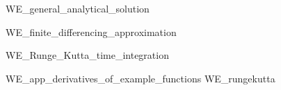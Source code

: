 \documentclass[a4paper,headsepline,12pt,oneside]{scrartcl}
\begin{document}


\newpage
\setcounter{page}{0}
\tableofcontents
\clearpage
\setcounter{page}{1}

{WE_general_analytical_solution}

\clearpage

{WE_finite_differencing_approximation}
\clearpage

{WE_Runge_Kutta_time_integration}


\clearpage
\clearpage
\appendix
{WE_app_derivatives_of_example_functions}
{WE_rungekutta}
\end{document}
